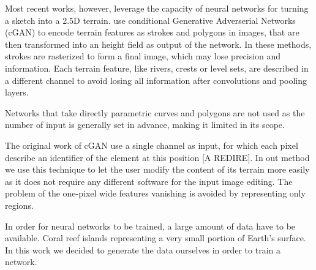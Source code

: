 Most recent works, however, leverage the capacity of neural networks for turning a sketch into a 2.5D terrain. \citep{Guerin2017} use conditional Generative Adverserial Networks (cGAN) to encode terrain features as strokes and polygons in images, that are then transformed into an height field as output of the network. In these methods, strokes are rasterized to form a final image, which may lose precision and information. Each terrain feature, like rivers, crests or level sets, are described in a different channel to avoid losing all information after convolutions and pooling layers. 

Networks that take directly parametric curves and polygons are not used as the number of input is generally set in advance, making it limited in its scope.

The original work of cGAN \cite{Isola2017} use a single channel as input, for which each pixel describe an identifier of the element at this position [A REDIRE]. In out method we use this technique to let the user modify the content of its terrain more easily as it does not require any different software for the input image editing. The problem of the one-pixel wide features vanishing is avoided by representing only regions.

In order for neural networks to be trained, a large amount of data have to be available. Coral reef islands representing a very small portion of  Earth's surface. In this work we decided to generate the data ourselves in order to train a network. 

